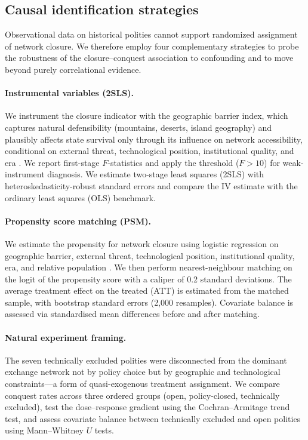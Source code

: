 \documentclass[pdflatex,sn-basic]{sn-jnl}
\theoremstyle{thmstyleone}%
\theoremstyle{thmstyletwo}%
\theoremstyle{thmstylethree}%
\begin{document}
\subsection{Causal identification strategies}\label{sec:methods-causal}

Observational data on historical polities cannot support randomized assignment of network closure. We therefore employ four complementary strategies to probe the robustness of the closure--conquest association to confounding and to move beyond purely correlational evidence.

\paragraph{Instrumental variables (2SLS).}
We instrument the closure indicator with the geographic barrier index, which captures natural defensibility (mountains, deserts, island geography) and plausibly affects state survival only through its influence on network accessibility, conditional on external threat, technological position, institutional quality, and era \citep{Angrist1996}. We report first-stage $F$-statistics and apply the \citet{StaigerStock1997} threshold ($F > 10$) for weak-instrument diagnosis. We estimate two-stage least squares (2SLS) with heteroskedasticity-robust standard errors and compare the IV estimate with the ordinary least squares (OLS) benchmark.

\paragraph{Propensity score matching (PSM).}
We estimate the propensity for network closure using logistic regression on geographic barrier, external threat, technological position, institutional quality, era, and relative population \citep{RosenbaumRubin1983}. We then perform nearest-neighbour matching on the logit of the propensity score with a caliper of 0.2 standard deviations. The average treatment effect on the treated (ATT) is estimated from the matched sample, with bootstrap standard errors (2{,}000 resamples). Covariate balance is assessed via standardised mean differences before and after matching.

\paragraph{Natural experiment framing.}
The seven technically excluded polities were disconnected from the dominant exchange network not by policy choice but by geographic and technological constraints---a form of quasi-exogenous treatment assignment. We compare conquest rates across three ordered groups (open, policy-closed, technically excluded), test the dose--response gradient using the Cochran--Armitage trend test, and assess covariate balance between technically excluded and open polities using Mann--Whitney $U$ tests.
\end{document}
